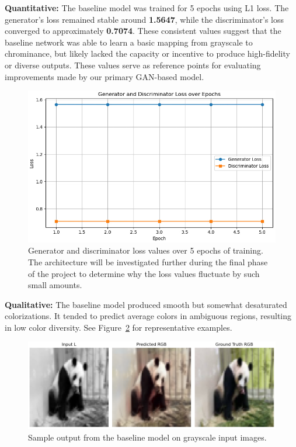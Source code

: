 \documentclass{article} %
\begin{document}
\textbf{Quantitative:} The baseline model was trained for 5 epochs using L1 loss. The generator's loss remained stable around \textbf{1.5647}, while the discriminator's loss 
converged to approximately \textbf{0.7074}. These consistent values suggest that the baseline network was able to learn a basic mapping from grayscale to chrominance, but likely 
lacked the capacity or incentive to produce high-fidelity or diverse outputs. These values serve as reference points for evaluating improvements made by our primary GAN-based model.

\begin{figure}[htbp]
    \centering
    \includegraphics[width=\textwidth]{Figs/baseline_learning_curve.jpg}
    \caption{Generator and discriminator loss values over 5 epochs of training. The architecture will be investigated further during the final phase of the project to determine why 
    the loss values fluctuate by such small amounts.}

    \label{fig:baseline_outputs}
\end{figure}

\textbf{Qualitative:} The baseline model produced smooth but somewhat desaturated colorizations. It tended to predict average colors in ambiguous regions, resulting in low color 
diversity. See Figure~\ref{fig:baseline_outputs} for representative examples.

\begin{figure}[htbp]
    \centering
    \includegraphics[width=\textwidth]{Figs/baseline_output.png}
    \caption{Sample output from the baseline model on grayscale input images.}
    \label{fig:baseline_outputs}
\end{figure}
\end{document}
